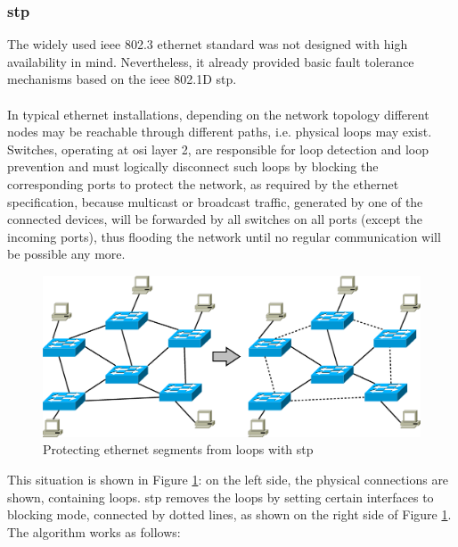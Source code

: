 \subsubsection{\gls{stp}}
The widely used \gls{ieee} 802.3 ethernet standard was not designed with high availability in mind.
Nevertheless, it already provided basic fault tolerance mechanisms based on the \gls{ieee} 802.1D \gls{stp}. 
\\
\\
In typical ethernet installations, depending on the network topology different
nodes may be reachable through different paths, i.e. physical loops may exist.
Switches, operating at \gls{osi} layer 2, are responsible for loop detection and
loop prevention and must logically disconnect such loops by blocking the corresponding ports to protect the network,
as required by the ethernet specification, because multicast or broadcast traffic, generated by one of the connected
devices, will be forwarded by all switches on all ports (except the incoming ports), thus flooding the network until no regular communication will be possible any
more.
\\
\begin{figure}[H]
 \includegraphics[width=\linewidth]{figures/stp.eps}
 \caption{Protecting ethernet segments from loops with \gls{stp}}
\label{fig:stp1}
\end{figure}
This situation is shown in Figure \ref{fig:stp1}: on the left side, the physical connections are shown, containing loops. 
\gls{stp} removes
the loops by setting certain interfaces to blocking mode, connected by dotted lines, as shown on the right side of Figure \ref{fig:stp1}.
\\
The algorithm works as follows:

